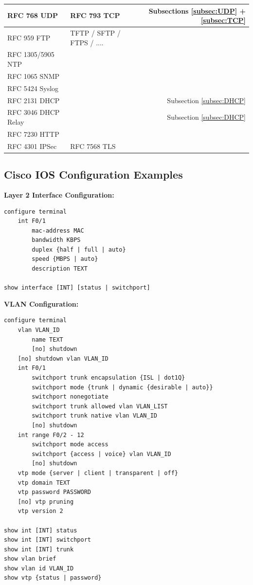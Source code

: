 \documentclass[12pt]{article}
\begin{document}
\begin{table}[H]
\begin{tabular}{llr}
	RFC 768 UDP			& RFC 793 TCP			& Subsections \ref{subsec:UDP} + \ref{subsec:TCP}\\\hline
	RFC 959 FTP			& TFTP / SFTP / FTPS / ....	&\\
	RFC 1305/5905 NTP		&					&\\
	RFC 1065 SNMP			&					&\\
	RFC 5424 Syslog			&					&\\
	RFC 2131 DHCP			&					& Subsection \ref{subsec:DHCP}\\
	RFC 3046 DHCP Relay		&					& Subsection \ref{subsec:DHCP}\\
	RFC 7230 HTTP			&					&\\
	RFC 4301 IPSec			& RFC 7568 TLS			&\\\hline
	\end{tabular}\end{table}


	\newpage
	\subsection{Cisco IOS Configuration Examples \label{subsec:CONFIG}}
	\textbf{Layer 2 Interface Configuration:}
	\begin{lstlisting}
configure terminal
	int F0/1
		mac-address MAC
		bandwidth KBPS
		duplex {half | full | auto}
		speed {MBPS | auto}
		description TEXT
		
show interface [INT] [status | switchport]
	\end{lstlisting}
	\vspace{8px}

	\noindent\textbf{VLAN Configuration:}
	\begin{lstlisting}
configure terminal
	vlan VLAN_ID
		name TEXT
		[no] shutdown
	[no] shutdown vlan VLAN_ID
	int F0/1
		switchport trunk encapsulation {ISL | dot1Q}
		switchport mode {trunk | dynamic {desirable | auto}}
		switchport nonegotiate
		switchport trunk allowed vlan VLAN_LIST
		switchport trunk native vlan VLAN_ID
		[no] shutdown
	int range F0/2 - 12
		switchport mode access
		switchport {access | voice} vlan VLAN_ID
		[no] shutdown
	vtp mode {server | client | transparent | off}
	vtp domain TEXT
	vtp password PASSWORD
	[no] vtp pruning
	vtp version 2

show int [INT] status
show int [INT] switchport
show int [INT] trunk
show vlan brief
show vlan id VLAN_ID
show vtp {status | password}
	\end{lstlisting}
	\vspace{8px}
\end{document}
